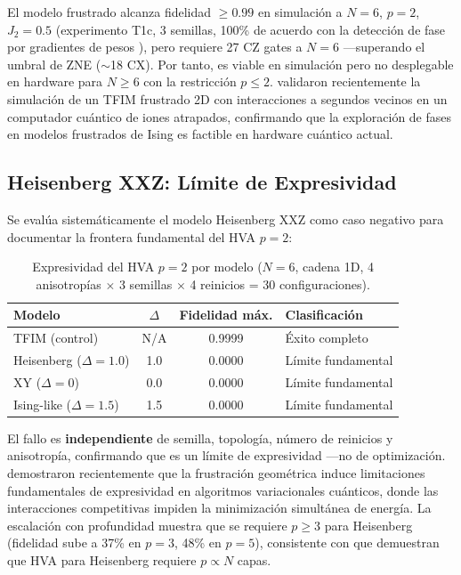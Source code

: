 \documentclass[11pt,a4paper,spanish]{book}
\begin{document}
El modelo frustrado alcanza fidelidad $\geq 0.99$ en simulación a $N = 6$, $p = 2$, $J_2 = 0.5$ (experimento T1c, 3 semillas, 100\% de acuerdo con la detección de fase por gradientes de pesos \citep{hernandes2025}), pero requiere 27 CZ gates a $N = 6$ ---superando el umbral de ZNE ($\sim$18 CX). Por tanto, es viable en simulación pero no desplegable en hardware para $N \geq 6$ con la restricción $p \leq 2$. \citet{teoh2025} validaron recientemente la simulación de un TFIM frustrado 2D con interacciones a segundos vecinos en un computador cuántico de iones atrapados, confirmando que la exploración de fases en modelos frustrados de Ising es factible en hardware cuántico actual.

\subsection{Heisenberg XXZ: Límite de Expresividad}

Se evalúa sistemáticamente el modelo Heisenberg XXZ como caso negativo para documentar la frontera fundamental del HVA $p = 2$:

\begin{table}[h]
\centering
\caption{Expresividad del HVA $p = 2$ por modelo ($N = 6$, cadena 1D, 4 anisotropías $\times$ 3 semillas $\times$ 4 reinicios = 30 configuraciones).}
\label{tab:heisenberg}
\begin{tabular}{lccl}
\toprule
\textbf{Modelo} & \textbf{$\Delta$} & \textbf{Fidelidad máx.} & \textbf{Clasificación} \\
\midrule
TFIM (control) & N/A & 0.9999 & Éxito completo \\
Heisenberg ($\Delta = 1.0$) & 1.0 & 0.0000 & Límite fundamental \\
XY ($\Delta = 0$) & 0.0 & 0.0000 & Límite fundamental \\
Ising-like ($\Delta = 1.5$) & 1.5 & 0.0000 & Límite fundamental \\
\bottomrule
\end{tabular}
\end{table}

El fallo es \textbf{independiente} de semilla, topología, número de reinicios y anisotropía, confirmando que es un límite de expresividad ---no de optimización. \citet{huang2026frustration} demostraron recientemente que la frustración geométrica induce limitaciones fundamentales de expresividad en algoritmos variacionales cuánticos, donde las interacciones competitivas impiden la minimización simultánea de energía. La escalación con profundidad muestra que se requiere $p \geq 3$ para Heisenberg (fidelidad sube a 37\% en $p = 3$, 48\% en $p = 5$), consistente con \citet{wiersema2020} que demuestran que HVA para Heisenberg requiere $p \propto N$ capas.
\end{document}
